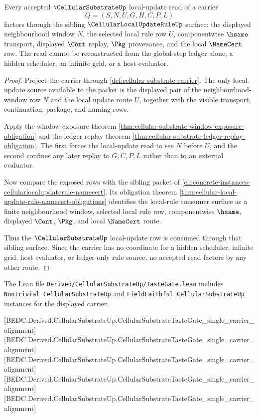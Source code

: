 \begin{theorem}
\label{thm:cellular-substrate-local-rule-factorization}
Every accepted $\CellularSubstrateUp$ local-update read of a carrier
$$
Q=(S,N,U,G,H,C,P,L)
$$
factors through the sibling $\CellularLocalUpdateRuleUp$ surface: the displayed neighbourhood window $N$, the selected local rule row $U$, componentwise $\hsame$ transport, displayed $\Cont$ replay, $\Pkg$ provenance, and the local $\NameCert$ row. The read cannot be reconstructed from the global-step ledger alone, a hidden scheduler, an infinite grid, or a host evaluator.
\end{theorem}
\begin{proof}
Project the carrier through \autoref{def:cellular-substrate-carrier}. The only local-update source available to the packet is the displayed pair of the neighbourhood-window row $N$ and the local update route $U$, together with the visible transport, continuation, package, and naming rows.

Apply the window exposure theorem \autoref{thm:cellular-substrate-window-exposure-obligation} and the ledger replay theorem \autoref{thm:cellular-substrate-ledger-replay-obligation}. The first forces the local-update read to see $N$ before $U$, and the second confines any later replay to $G,C,P,L$ rather than to an external evaluator.

Now compare the exposed rows with the sibling packet of \autoref{ch:concrete-instances-cellularlocalupdaterule-namecert}. Its obligation theorem \autoref{thm:cellular-local-update-rule-namecert-obligations} identifies the local-rule consumer surface as a finite neighbourhood window, selected local rule row, componentwise $\hsame$, displayed $\Cont$, $\Pkg$, and local $\NameCert$ route.

Thus the $\CellularSubstrateUp$ local-update row is consumed through that sibling surface. Since the carrier has no coordinate for a hidden scheduler, infinite grid, host evaluator, or ledger-only rule source, no accepted read factors by any other route.
\end{proof}

The Lean file \texttt{Derived/CellularSubstrateUp/TasteGate.lean} includes \texttt{Nontrivial CellularSubstrateUp} and \texttt{FieldFaithful CellularSubstrateUp} instances for the displayed carrier.

[BEDC.Derived.CellularSubstrateUp.CellularSubstrateTasteGate\_single\_carrier\_alignment]
[BEDC.Derived.CellularSubstrateUp.CellularSubstrateTasteGate\_single\_carrier\_alignment]
[BEDC.Derived.CellularSubstrateUp.CellularSubstrateTasteGate\_single\_carrier\_alignment]
[BEDC.Derived.CellularSubstrateUp.CellularSubstrateTasteGate\_single\_carrier\_alignment]
[BEDC.Derived.CellularSubstrateUp.CellularSubstrateTasteGate\_single\_carrier\_alignment]

